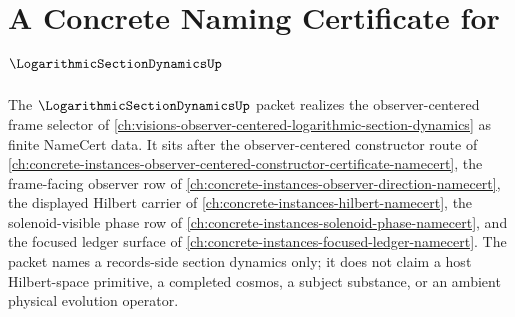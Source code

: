 \chapter{A Concrete Naming Certificate for $\LogarithmicSectionDynamicsUp$}
\label{ch:concrete-instances-logarithmic-section-dynamics-namecert}

The $\LogarithmicSectionDynamicsUp$ packet realizes the observer-centered frame selector of \autoref{ch:visions-observer-centered-logarithmic-section-dynamics} as finite NameCert data. It sits after the observer-centered constructor route of \autoref{ch:concrete-instances-observer-centered-constructor-certificate-namecert}, the frame-facing observer row of \autoref{ch:concrete-instances-observer-direction-namecert}, the displayed Hilbert carrier of \autoref{ch:concrete-instances-hilbert-namecert}, the solenoid-visible phase row of \autoref{ch:concrete-instances-solenoid-phase-namecert}, and the focused ledger surface of \autoref{ch:concrete-instances-focused-ledger-namecert}. The packet names a records-side section dynamics only; it does not claim a host Hilbert-space primitive, a completed cosmos, a subject substance, or an ambient physical evolution operator.

